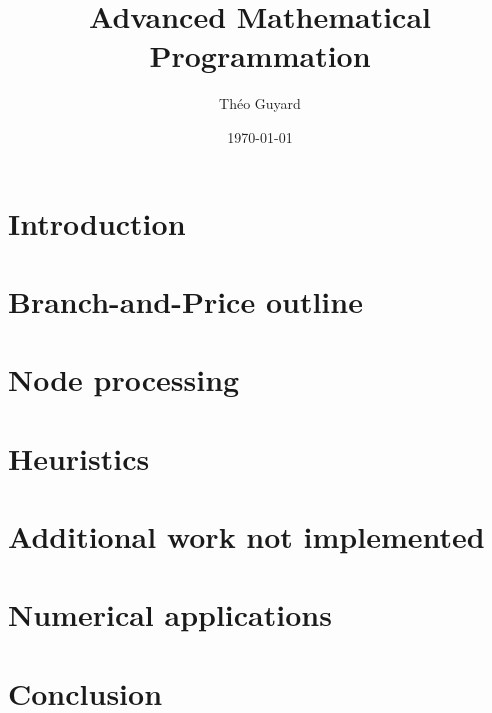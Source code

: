 \documentclass{article}
\title{Advanced Mathematical Programmation}
\author{Théo Guyard}
\date{\today}
\begin{document}

\newpage

\tableofcontents
\newpage

\section{Introduction}


\newpage

\section{Branch-and-Price outline}


\newpage

\section{Node processing}



\newpage

\section{Heuristics}


\newpage

\section{Additional work not implemented}


\newpage

\section{Numerical applications}


\newpage

\section{Conclusion}

\newpage

\printbibliography
\end{document}
